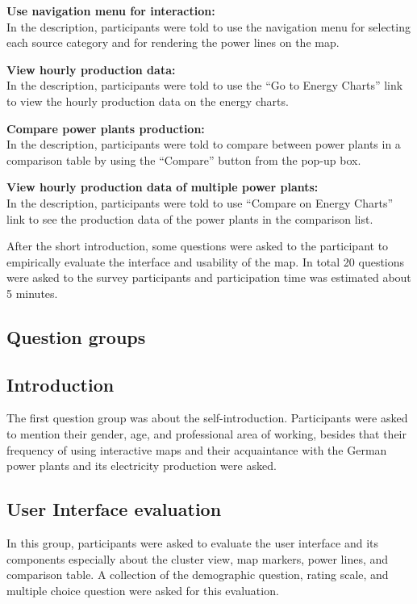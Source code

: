\textbf{Use navigation menu for interaction:}\\
In the description, participants were told to use the navigation menu for selecting each source category and for rendering the power lines on the map.

\textbf{View hourly production data:}\\
In the description, participants were told to use the “Go to Energy Charts” link to view the hourly production data on the energy charts.

\textbf{Compare power plants production:}\\
In the description, participants were told to compare between power plants in a comparison table by using the “Compare” button from the pop-up box.

\textbf{View hourly production data of multiple power plants:}\\
In the description, participants were told to use “Compare on Energy Charts” link to see the production data of the power plants in the comparison list. 

After the short introduction, some questions were asked to the participant to empirically evaluate the interface and usability of the map. In total 20 questions were asked to the survey participants and participation time was estimated about 5 minutes.  

\subsection{Question groups}
\label{sssec:quesGroup} 

\subsection*{Introduction}
\label{sssec:intro}

The first question group was about the self-introduction. Participants were asked to mention their gender, age, and professional area of working, besides that their frequency of using interactive maps and their acquaintance with the German power plants and its electricity production were asked. 

\subsection*{User Interface evaluation}
\label{sssec:uiEval}

In this group, participants were asked to evaluate the user interface and its components especially about the cluster view, map markers, power lines, and comparison table. A collection of the demographic question, rating scale, and multiple choice question were asked for this evaluation. 

